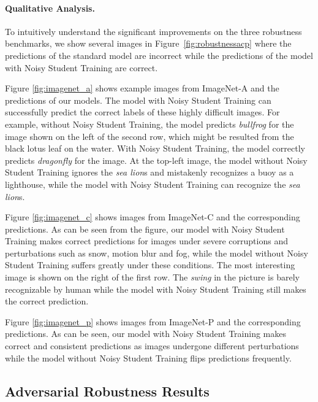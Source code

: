 \documentclass[10pt,twocolumn,letterpaper]{article}
\begin{document}
\paragraph{Qualitative Analysis.}

To intuitively understand the significant improvements on the three robustness benchmarks, we show several images in Figure~\ref{fig:robustnessacp} where the predictions of the standard model are incorrect while the predictions of the model with Noisy Student Training are correct. 

Figure \ref{fig:imagenet_a} shows example images from ImageNet-A and the predictions of our models. The model with Noisy Student Training can successfully predict the correct labels of these highly difficult images. For example, without Noisy Student Training, the model predicts \emph{bullfrog} for the image shown on the left of the second row, which might be resulted from the black lotus leaf on the water. With Noisy Student Training, the model correctly predicts \emph{dragonfly} for the image. At the top-left image, the model without Noisy Student Training ignores the \emph{sea lion}s and mistakenly recognizes a buoy as a lighthouse, while the model with Noisy Student Training can recognize the \emph{sea lion}s.




Figure \ref{fig:imagenet_c} shows images from ImageNet-C and the corresponding predictions. As can be seen from the figure, our model with Noisy Student Training makes correct predictions for images under severe corruptions and perturbations such as snow, motion blur and fog, while the model without Noisy Student Training suffers greatly under these conditions. The most interesting image is shown on the right of the first row. The \emph{swing} in the picture is barely recognizable by human while the model with Noisy Student Training still makes the correct prediction.



Figure \ref{fig:imagenet_p} shows images from ImageNet-P and the corresponding predictions. As can be seen, our model with Noisy Student Training makes correct and consistent predictions as images undergone different  perturbations while the model without Noisy Student Training flips predictions frequently. 


\subsection{Adversarial Robustness Results}
\end{document}
